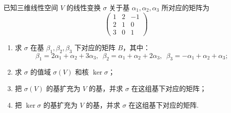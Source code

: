 \begin{example}{}{}
    已知三维线性空间 $V$ 的线性变换 $\sigma$ 关于基 $\alpha_1,\alpha_2,\alpha_3$ 所对应的矩阵为
    \[\begin{pmatrix}1 & 2 & -1 \\ 2 & 1 & 0 \\ 3 & 0 & 1\end{pmatrix}\]
    \begin{enumerate}
        \item 求 $\sigma$ 在基 $\beta_1,\beta_2,\beta_3$ 下对应的矩阵 $B$，其中：
              \[\beta_1=2\alpha_1+\alpha_2+3\alpha_3,\enspace \beta_2=\alpha_1+\alpha_2+2\alpha_3,\enspace \beta_3=-\alpha_1+\alpha_2+\alpha_3;\]

        \item 求 $\sigma$ 的值域 $\sigma(V)$ 和核 $\ker\sigma$；

        \item 把 $\sigma(V)$ 的基扩充为 $V$ 的基，并求 $\sigma$ 在这组基下对应的矩阵；

        \item 把 $\ker\sigma$ 的基扩充为 $V$ 的基，并求 $\sigma$ 在这组基下对应的矩阵.
    \end{enumerate}
\end{example}

